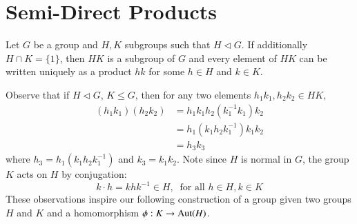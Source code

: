 \documentclass[12pt, a4paper, oneside, openright, titlepage]{book}
\begin{document}
\section{\textsection Semi-Direct Products}

\begin{rec}
    Let $G$ be a group and $H,K$ subgroups such that $H \vartriangleleft G$. If additionally $H\cap K = \{1\}$, then $HK$ is a subgroup of $G$ and every element of $HK$ can be written uniquely as a product $hk$ for some $h \in H$ and $k \in K$.
\end{rec}

Observe that if $H\vartriangleleft G$, $K \leq G$, then for any two elements $h_1k_1,h_2k_2 \in HK$, \begin{align*}
    (h_1k_1)(h_2k_2) &= h_1k_1h_2(k_1^{-1}k_1)k_2 \\
    &= h_1(k_1h_2k_1^{-1})k_1k_2 \\
    &= h_3k_3
\end{align*}
where $h_3 = h_1(k_1h_2k_1^{-1})$ and $k_3 = k_1k_2$. Note since $H$ is normal in $G$, the group $K$ acts on $H$ by conjugation: \begin{equation*}
    k\cdot h = khk^{-1} \in H,\;\;\text{for all } h\in H,k\in K
\end{equation*}
These observations inspire our following construction of a group given two groups $H$ and $K$ and a homomorphism $\phi:K\rightarrow \operatorname{Aut}(H)$.
\end{document}
